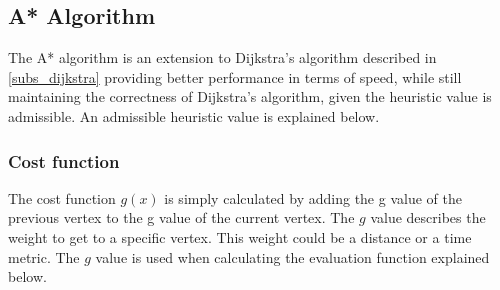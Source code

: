 





  \subsection{A* Algorithm}\label{subs_astar}


  The A* algorithm is an extension to Dijkstra's algorithm described in \cref{subs_dijkstra} providing better performance in terms of speed, while still maintaining the correctness of Dijkstra's algorithm, given the heuristic value is admissible. An admissible heuristic value is explained below.

  \subsubsection{Cost function}
  The cost function $g(x)$ is simply calculated by adding the g value of the previous vertex to the g value of the current vertex. The $g$ value describes the weight to get to a specific vertex. This weight could be a distance or a time metric. The $g$ value is used when calculating the evaluation function explained below.

